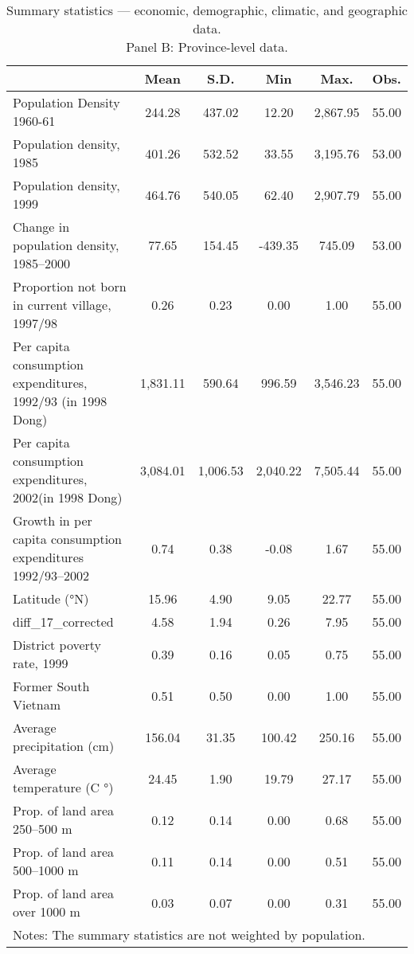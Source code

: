 \begin{table}[htbp]\centering
\def\sym#1{\ifmmode^{#1}\else\(^{#1}\)\fi}
\caption{Summary statistics — economic, demographic, climatic, and geographic data. \\ Panel B: Province-level data.}
\begin{tabular}{l*{1}{ccccc}}
\toprule
                    &        Mean&        S.D.&         Min&        Max.&        Obs.\\
\midrule
Population Density 1960-61&      244.28&      437.02&       12.20&    2,867.95&       55.00\\
Population density, 1985&      401.26&      532.52&       33.55&    3,195.76&       53.00\\
Population density, 1999&      464.76&      540.05&       62.40&    2,907.79&       55.00\\
Change in population density, 1985–2000&       77.65&      154.45&     -439.35&      745.09&       53.00\\
Proportion not born in current village, 1997/98&        0.26&        0.23&        0.00&        1.00&       55.00\\
Per capita consumption expenditures, 1992/93 (in 1998 Dong)&    1,831.11&      590.64&      996.59&    3,546.23&       55.00\\
Per capita consumption expenditures, 2002(in 1998 Dong)&    3,084.01&    1,006.53&    2,040.22&    7,505.44&       55.00\\
Growth in per capita consumption expenditures 1992/93–2002&        0.74&        0.38&       -0.08&        1.67&       55.00\\
Latitude (°N)       &       15.96&        4.90&        9.05&       22.77&       55.00\\
diff\_17\_corrected   &        4.58&        1.94&        0.26&        7.95&       55.00\\
District poverty rate, 1999&        0.39&        0.16&        0.05&        0.75&       55.00\\
Former South Vietnam&        0.51&        0.50&        0.00&        1.00&       55.00\\
Average precipitation (cm)&      156.04&       31.35&      100.42&      250.16&       55.00\\
Average temperature (C $°$)&       24.45&        1.90&       19.79&       27.17&       55.00\\
Prop. of land area 250–500 m&        0.12&        0.14&        0.00&        0.68&       55.00\\
Prop. of land area 500–1000 m&        0.11&        0.14&        0.00&        0.51&       55.00\\
Prop. of land area over 1000 m&        0.03&        0.07&        0.00&        0.31&       55.00\\
\bottomrule
\multicolumn{6}{l}{\footnotesize Notes: The summary statistics are not weighted by population.}\\
\end{tabular}
\end{table}

